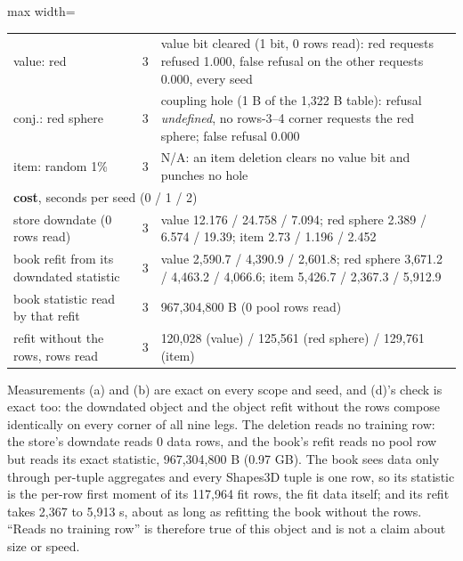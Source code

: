\documentclass{article} %
\begin{document}
\begin{table}[t]
\begin{adjustbox}{max width=\linewidth}
\begin{tabular}{lccccc}
value: red & 3 & \multicolumn{4}{l}{value bit cleared (1 bit, 0 rows read): red requests refused 1.000, false refusal on the other requests 0.000, every seed} \\
conj.: red sphere & 3 & \multicolumn{4}{l}{coupling hole (1 B of the 1,322 B table): refusal \emph{undefined}, no rows-3--4 corner requests the red sphere; false refusal 0.000} \\
item: random 1\% & 3 & \multicolumn{4}{l}{N/A: an item deletion clears no value bit and punches no hole} \\
\midrule
\multicolumn{6}{l}{\textbf{cost}, seconds per seed (0 / 1 / 2)} \\
store downdate (0 rows read) & 3 & \multicolumn{4}{l}{value 12.176 / 24.758 / 7.094; red sphere 2.389 / 6.574 / 19.39; item 2.73 / 1.196 / 2.452} \\
book refit from its downdated statistic & 3 & \multicolumn{4}{l}{value 2,590.7 / 4,390.9 / 2,601.8; red sphere 3,671.2 / 4,463.2 / 4,066.6; item 5,426.7 / 2,367.3 / 5,912.9} \\
book statistic read by that refit & 3 & \multicolumn{4}{l}{967,304,800 B (0 pool rows read)} \\
refit without the rows, rows read & 3 & \multicolumn{4}{l}{120,028 (value) / 125,561 (red sphere) / 129,761 (item)} \\
\bottomrule
\end{tabular}\end{adjustbox}
\end{table}

\noindent Measurements (a) and (b) are exact on every scope and seed, and (d)'s check is exact too:
the downdated object and the object refit without the rows compose identically on every corner of
all nine legs. The deletion reads no training row: the store's downdate reads 0 data rows, and the %
book's refit reads no pool row but reads its exact statistic, 967,304,800 B (0.97 GB). The book sees %
data only through per-tuple aggregates and every Shapes3D tuple is one row, so its statistic is the
per-row first moment of its 117,964 fit rows, the fit data itself; and its refit takes 2,367 to %
5,913 s, about as long as refitting the book without the rows. ``Reads no training row'' is %
therefore true of this object and is not a claim about size or speed.
\end{document}

